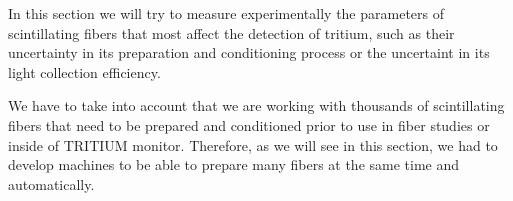 In this section we will try to measure experimentally the parameters of scintillating fibers that most affect the detection of tritium, such as their uncertainty in its preparation and conditioning process or the uncertaint in its light collection efficiency.

We have to take into account that we are working with thousands of scintillating fibers that need to be prepared and conditioned prior to use in fiber studies or inside of TRITIUM monitor. Therefore, as we will see in this section, we had to develop machines to be able to prepare many fibers at the same time and automatically.